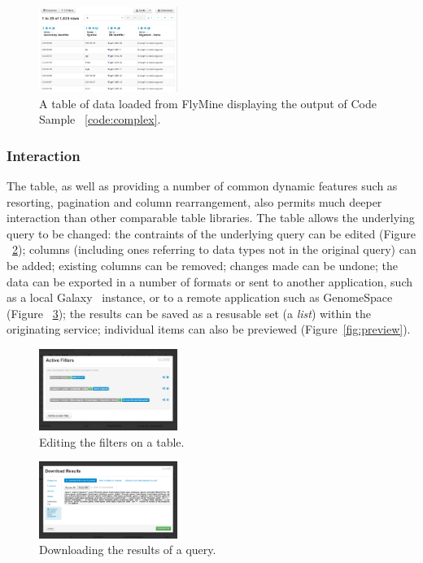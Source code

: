 \documentclass[10pt,a4paper,twocolumn]{article}
\begin{document}
\begin{figure}
\centering
\includegraphics[width=0.4\textwidth]{imtable-complex.png}
\caption{
    \label{fig:complex}
    A table of data loaded from FlyMine displaying the output of Code Sample
    ~\ref{code:complex}.
}
\end{figure}

\subsubsection*{Interaction}

The table, as well as providing a number of common dynamic features such as
resorting, pagination and column rearrangement, also permits much deeper
interaction than other comparable table libraries. The table allows the
underlying query to be changed: the contraints of the underlying query can be
edited (Figure ~\ref{fig:edit-filters}); columns (including ones referring to data types
not in the original query) can be added; existing columns can be removed;
changes made can be undone; the data can be exported in a number of formats or
sent to another application, such as a local Galaxy~\cite{galaxy} instance,
or to a remote application such as GenomeSpace~\cite{genomespace} (Figure
~\ref{fig:export}); the results can be saved as a resusable set (a \emph{list})
within the originating service; individual items can also be previewed
(Figure~\ref{fig:preview}).

\begin{figure}[htb]
\centering
\includegraphics[width=0.4\textwidth]{table-edit-filters.png}
\caption{\label{fig:edit-filters} Editing the filters on a table.}
\end{figure}

\begin{figure}[htb]
\centering
\includegraphics[width=0.4\textwidth]{table-download.png}
\caption{\label{fig:export} Downloading the results of a query.}
\end{figure}
\end{document}

